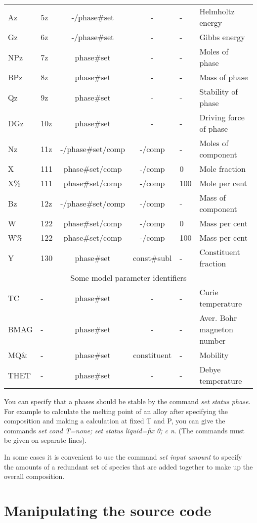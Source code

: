 \documentclass[12pt]{article}
\begin{document}
\begin{table}
\begin{tabular}{|llccll|}
Az     & 5z & -/phase\#set & - & - & Helmholtz energy\\
Gz     & 6z & -/phase\#set & - & - & Gibbs energy\\
NPz    & 7z &  phase\#set & - & - & Moles of phase\\
BPz    & 8z & phase\#set & - & - & Mass of phase\\
Qz     & 9z & phase\#set & - & -  & Stability of phase\\
DGz    & 10z & phase\#set & - & -  & Driving force of phase\\
Nz     & 11z & -/phase\#set/comp & -/comp & -  & Moles of component\\
X      & 111 & phase\#set/comp & -/comp & 0  & Mole fraction\\
X\%    & 111 & phase\#set/comp & -/comp & 100 & Mole per cent\\
Bz     & 12z & -/phase\#set/comp & -/comp & -  & Mass of component\\
W      & 122 & phase\#set/comp & -/comp & 0 & Mass per cent\\
W\%    & 122 & phase\#set/comp & -/comp & 100 & Mass per cent\\
Y      & 130 & phase\#set & const\#subl & -& Constituent fraction\\\hline
\multicolumn{6}{|c|}{Some model parameter identifiers}\\\hline
TC     & - & phase\#set & - & - & Curie temperature\\
BMAG   & - & phase\#set & - & - & Aver. Bohr magneton number\\
MQ\&   & - & phase\#set & constituent & - & Mobility\\
THET   & - & phase\#set & - & - & Debye temperature\\\hline
\end{tabular}
\end{table}

You can specify that a phases should be stable by the command {\em set
status phase}.  For example to calculate the melting point of an alloy
after specifying the composition and making a calculation at fixed T
and P, you can give the commands {\em set cond T=none; set status
liquid=fix 0; c n}.  (The commands must be given on separate lines).

In some cases it is convenient to use the command {\em set input
amount} to specify the amounts of a redundant set of species that are
added together to make up the overall composition.

\section{Manipulating the source code}
\end{document}
